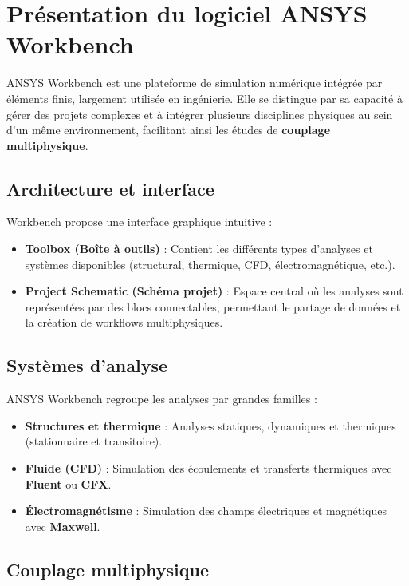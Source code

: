 \documentclass{rapportECL}
\begin{document}
\section{Présentation du logiciel ANSYS Workbench}

ANSYS Workbench est une plateforme de simulation numérique intégrée par éléments finis, largement utilisée en ingénierie. Elle se distingue par sa capacité à gérer des projets complexes et à intégrer plusieurs disciplines physiques au sein d’un même environnement, facilitant ainsi les études de \textbf{couplage multiphysique}.

\subsection{Architecture et interface}

Workbench propose une interface graphique intuitive :  
\begin{itemize}
    \item \textbf{Toolbox (Boîte à outils)} : Contient les différents types d’analyses et systèmes disponibles (structural, thermique, CFD, électromagnétique, etc.).  
    \item \textbf{Project Schematic (Schéma projet)} : Espace central où les analyses sont représentées par des blocs connectables, permettant le partage de données et la création de workflows multiphysiques.
\end{itemize}

\subsection{Systèmes d'analyse}

ANSYS Workbench regroupe les analyses par grandes familles :  
\begin{itemize}
    \item \textbf{Structures et thermique} : Analyses statiques, dynamiques et thermiques (stationnaire et transitoire).  
    \item \textbf{Fluide (CFD)} : Simulation des écoulements et transferts thermiques avec \textbf{Fluent} ou \textbf{CFX}.  
    \item \textbf{Électromagnétisme} : Simulation des champs électriques et magnétiques avec \textbf{Maxwell}.  
\end{itemize}

\subsection{Couplage multiphysique}
\end{document}
